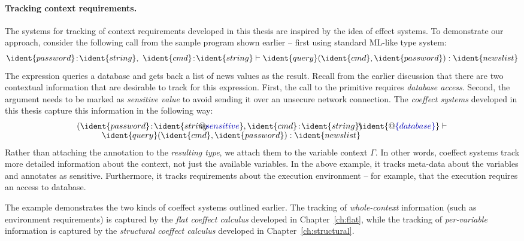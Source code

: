 \paragraph{Tracking context requirements.}

The systems for tracking of context requirements developed in this thesis are inspired by the idea
of effect systems. To demonstrate our approach, consider the following call from the sample program
shown earlier -- first using standard ML-like type system:
%
\begin{equation*}
\ident{password}\!:\!\ident{string},~\ident{cmd}\!:\!\ident{string} 
  \vdash \ident{query}(\ident{cmd}, \ident{password}) : \ident{news list}
\end{equation*}
%
The expression queries a database and gets back a list of news values as the result. Recall from the
earlier discussion that there are two contextual information that are desirable to track for this 
expression. First, the call to the  primitive requires \emph{database access}. Second,
the  argument needs to be marked as \emph{sensitive value} to avoid sending it over
an unsecure network connection.
The \emph{coeffect systems} developed in this thesis capture this information in the following way: 
%
\begin{equation*}
\begin{array}{l}
 ( \ident{password}\!:\!\ident{string \hspace{-1em}{\footnotesize @ \aclrd{sensitive}}},
   \ident{cmd}\!:\!\ident{string})
 \hspace{-0.5em}
 \ident{\footnotesize @ \aclrd{\{ database \}}} \vdash \\[-0.1em]
 \hspace{3em} \ident{query}(\ident{cmd}, \ident{password}) : \ident{news list}
\end{array}
\end{equation*}
%
Rather than attaching the annotation to the \emph{resulting type}, we attach them to the variable
context $\Gamma$. In other words, coeffect systems track more detailed information about the context,
not just the available variables. In the above example, it tracks meta-data about the variables
and annotates  as sensitive. Furthermore, it tracks requirements about the execution
environment -- for example, that the execution requires an access to database.

The example demonstrates the two kinds of coeffect systems outlined earlier. The tracking of 
\emph{whole-context} information (such as environment requirements) is captured by the \emph{flat 
coeffect calculus} developed in Chapter~\ref{ch:flat}, while the tracking of \emph{per-variable} 
information is captured by the \emph{structural coeffect calculus} developed in Chapter~\ref{ch:structural}.

